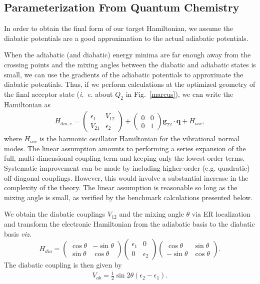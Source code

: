 \subsection{Parameterization From Quantum Chemistry}

 In order to obtain the final form of our target Hamiltonian, we assume the diabatic  potentials
are a good approximation to the actual adiabatic potentials.

When the adiabatic (and diabatic) energy minima
are far enough away from the crossing points and the mixing angles between the diabatic  and adiabatic
states is small, we can
use the gradients of the adiabatic potentials to approximate the diabatic potentials.
Thus, if we perform calculations at the
optimized geometry of the final acceptor state  ({\em i.~e.} about $Q_{2}$  in Fig.~\ref{marcus}),
we can write the Hamiltonian as
\begin{eqnarray}
H_{dia,e}=\left(\begin{array}{cc}
\epsilon_{1} & V_{12}\\
V_{21} & \epsilon_{2}
\end{array}\right)+\left(\begin{array}{cc}
0 & 0\\
0 & 1
\end{array}\right) {\mathbf g}_{22}\cdot{\mathbf q}+H_{osc},
\end{eqnarray}
where $H_{osc}$ is the harmonic oscillator Hamiltonian for the vibrational normal modes.
The linear assumption amounts  to performing a series expansion of the
full, multi-dimensional coupling term and keeping only the lowest order terms.
Systematic improvement can be made by including higher-order (e.g.  quadratic) off-diagonal couplings.
However, this would involve a substantial increase in the complexity of the theory.
The linear assumption is reasonable so long as  the mixing angle is small,
as verified by the benchmark calculations presented below.

We obtain the diabatic couplings $V_{12}$
and the mixing angle $\theta$  via ER localization and transform the electronic Hamiltonian
from the adiabatic basis to the diabatic basis {\em viz.}
\begin{equation}
H_{dia}=\left(\begin{array}{cc}
\cos\theta & -\sin\theta\\
\sin\theta & \cos\theta
\end{array}\right)\left(\begin{array}{cc}
\epsilon_{1}  & 0 \\
0  & \epsilon_{2}
\end{array}\right)\left(\begin{array}{cc}
\cos\theta & \sin\theta\\
-\sin\theta & \cos\theta
\end{array}\right).\label{eq:boys}
\end{equation}
The diabatic coupling is then given by
\begin{eqnarray}
V_{ab}=\frac{1}{2}\sin2\theta\left(\epsilon_{2}-\epsilon_{1}\right).
\end{eqnarray}


